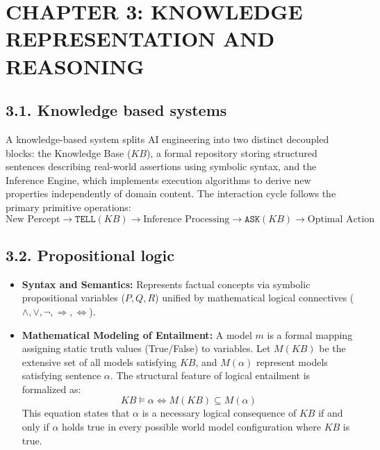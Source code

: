\documentclass[../main.tex]{subfiles}
\begin{document}

\section{CHAPTER 3: KNOWLEDGE REPRESENTATION AND REASONING}

\subsection{3.1. Knowledge based systems}
A knowledge-based system splits AI engineering into two distinct decoupled blocks: the Knowledge Base ($KB$), a formal repository storing structured sentences describing real-world assertions using symbolic syntax, and the Inference Engine, which implements execution algorithms to derive new properties independently of domain content. The interaction cycle follows the primary primitive operations:
\begin{equation}
    \text{New Percept} \xrightarrow{} \texttt{TELL}(KB) \xrightarrow{} \text{Inference Processing} \xrightarrow{} \texttt{ASK}(KB) \rightarrow \text{Optimal Action}
\end{equation}

\subsection{3.2. Propositional logic}
\begin{itemize}
    \item \textbf{Syntax and Semantics:} Represents factual concepts via symbolic propositional variables ($P, Q, R$) unified by mathematical logical connectives ($\wedge, \vee, \neg, \Rightarrow, \Leftrightarrow$).
    \item \textbf{Mathematical Modeling of Entailment:} A model $m$ is a formal mapping assigning static truth values (True/False) to variables. Let $M(KB)$ be the extensive set of all models satisfying $KB$, and $M(\alpha)$ represent models satisfying sentence $\alpha$. The structural feature of logical entailment is formalized as:
    \begin{equation}
        KB \models \alpha \iff M(KB) \subseteq M(\alpha)
    \end{equation}
    This equation states that $\alpha$ is a necessary logical consequence of $KB$ if and only if $\alpha$ holds true in every possible world model configuration where $KB$ is true.
\end{itemize}
\end{document}
